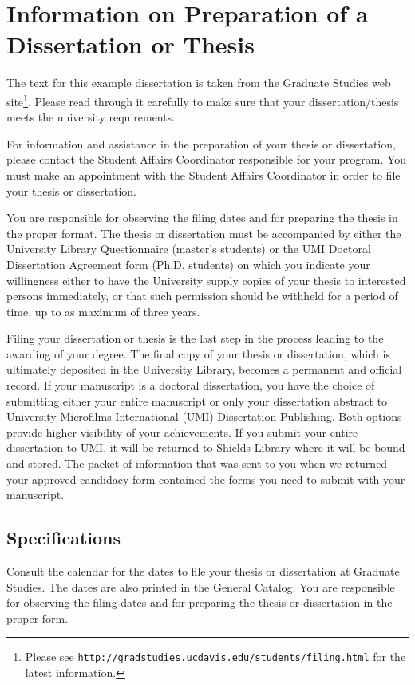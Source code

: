 \chapter{Information on Preparation of a Dissertation or Thesis}
%
The text for this example dissertation is taken from the Graduate Studies web site\footnote{Please see \texttt{http://gradstudies.ucdavis.edu/students/filing.html} for the latest information.}. Please read through it carefully to make sure that your dissertation/thesis meets the university requirements.

For information and assistance in the preparation of your thesis or dissertation, please contact the Student Affairs Coordinator responsible for your program. You must make an appointment with the Student Affairs Coordinator in order to file your thesis or dissertation.

You are responsible for observing the filing dates and for preparing the thesis in the proper format. The thesis or dissertation must be accompanied by either the University Library Questionnaire (master's students) or the UMI Doctoral Dissertation Agreement form (Ph.D. students) on which you indicate your willingness either to have the University supply copies of your thesis to interested persons immediately, or that such permission should be withheld for a period of time, up to as maximum of three years.

Filing your dissertation or thesis is the last step in the process leading to the awarding of your degree. The final copy of your thesis or dissertation, which is ultimately deposited in the University Library, becomes a permanent and official record. If your manuscript is a doctoral dissertation, you have the choice of submitting either your entire manuscript or only your dissertation abstract to University Microfilms International (UMI) Dissertation Publishing. Both options provide higher visibility of your achievements. If you submit your entire dissertation to UMI, it will be returned to Shields Library where it will be bound and stored. The packet of information that was sent to you when we returned your approved candidacy form contained the forms you need to submit with your manuscript.


\section{Specifications}
%
Consult the calendar for the dates to file your thesis or dissertation at Graduate Studies. The dates are also printed in the General Catalog. You are responsible for observing the filing dates and for preparing the thesis or dissertation in the proper form.

